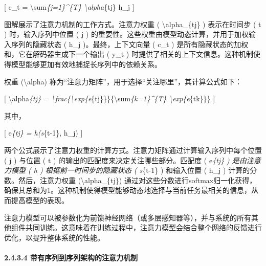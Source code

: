 {[} c\_t = \textbackslash sum\emph{\{j=1\}\^{}\{T\}
\textbackslash alpha}\{tj\} h\_j {]}


图解展示了注意力机制的工作方式。注意力权重 (
\textbackslash alpha\_\{tj\} ) 表示在时间步 ( t ) 时，输入序列中位置 ( j
) 的重要性。这些权重由模型动态计算，并用于加权输入序列的隐藏状态 ( h\_j
)。最终，上下文向量 ( c\_t )
是所有隐藏状态的加权和，它在解码器生成下一个输出 ( y\_t )
时提供了相关的上下文信息。这种机制使得模型能够更加有效地捕捉长序列中的依赖关系。


权重 (\textbackslash alpha)
称为``注意力矩阵''，用于选择``关注哪里''，其计算公式如下：

{[} \textbackslash alpha\emph{\{tj\} =
\textbackslash frac\{\textbackslash exp\{e}\{tj\}\}\}\{\textbackslash sum\emph{\{k=1\}\^{}\{T\}
\textbackslash exp\{e}\{tk\}\}\} {]}


其中，

{[} e\emph{\{tj\} = h(s}\{t-1\}, h\_j) {]}


两个公式展示了注意力权重的计算方式。注意力矩阵通过计算输入序列中每个位置
( j ) 与位置 ( t ) 的输出的匹配度来决定关注哪些部分。匹配度 (
e\emph{\{tj\} ) 是由注意力模型 ( h ) 根据前一时间步的隐藏状态 (
s}\{t-1\} ) 和输入位置 ( h\_j ) 计算的分数。然后，注意力权重
(\textbackslash alpha\_\{tj\})
通过对这些分数进行softmax归一化获得，确保其总和为1。这种机制使得模型能够动态地选择与当前任务最相关的信息，从而提高模型的表现。

注意力模型可以被参数化为前馈神经网络（或多层感知器等），并与系统的所有其他组件共同训练。这意味着在训练过程中，注意力模型会结合整个网络的反馈进行优化，以提升整体系统的性能。

\paragraph{\texorpdfstring{\textbf{2.4.3.4}
\textbf{带有序列到序列架构的注意力机制}}{2.4.3.4 带有序列到序列架构的注意力机制}}\label{2434-ux5e26ux6709ux5e8fux5217ux5230ux5e8fux5217ux67b6ux6784ux7684ux6ce8ux610fux529bux673aux5236}

